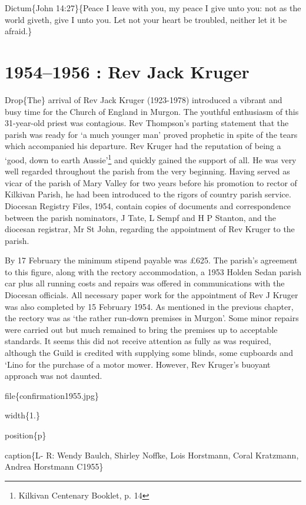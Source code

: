 Dictum\{John 14:27\}\{Peace I leave with you, my peace I give unto you: not as the world giveth, give I unto you. Let not your heart be troubled, neither let it be afraid.\}

\hypertarget{rev-jack-kruger}{%
\chapter{1954--1956 : Rev Jack Kruger}\label{rev-jack-kruger}}

Drop\{The\} arrival of Rev Jack Kruger (1923-1978) introduced a vibrant and busy time for the Church of England in Murgon. The youthful enthusiasm of this 31-year-old priest was contagious. Rev Thompson's parting statement that the parish was ready for `a much younger man' proved prophetic in spite of the tears which accompanied his departure. Rev Kruger had the reputation of being a `good, down to earth Aussie'\footnote{Kilkivan Centenary Booklet, p. 14} and quickly gained the support of all. He was very well regarded throughout the parish from the very beginning. Having served as vicar of the parish of Mary Valley for two years before his promotion to rector of Kilkivan Parish, he had been introduced to the rigors of country parish service. Diocesan Registry Files, 1954, contain copies of documents and correspondence between the parish nominators, J Tate, L Sempf and H P Stanton, and the diocesan registrar, Mr St John, regarding the appointment of Rev Kruger to the parish.

By 17 February the minimum stipend payable was £625. The parish's agreement to this figure, along with the rectory accommodation, a 1953 Holden Sedan parish car plus all running costs and repairs was offered in communications with the Diocesan officials. All necessary paper work for the appointment of Rev J Kruger was also completed by 15 February 1954. As mentioned in the previous chapter, the rectory was as `the rather run-down premises in Murgon'. Some minor repairs were carried out but much remained to bring the premises up to acceptable standards. It seems this did not receive attention as fully as was required, although the Guild is credited with supplying some blinds, some cupboards and `Lino for the purchase of a motor mower. However, Rev Kruger's buoyant approach was not daunted.

file\{confirmation1955.jpg\}

width\{1.\}

position\{p\}

caption\{L- R: Wendy Baulch, Shirley Noffke, Lois Horstmann, Coral Kratzmann, Andrea Horstmann C1955\}

